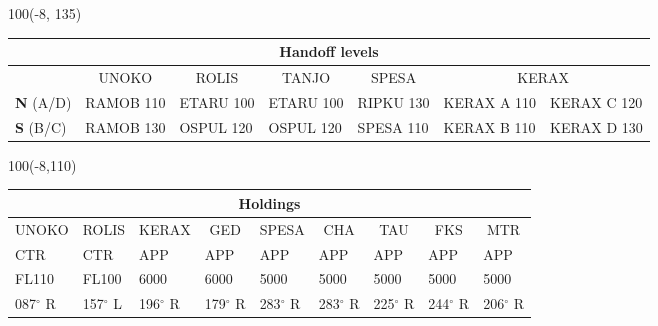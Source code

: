 \documentclass[10pt,landscape,a4paper]{article}
\begin{document}
\begin{textblock}{100}(-8, 135)
  \begin{table}[]
    \begin{tabular}{|l|l|l|l||l|l|l|}
      \multicolumn{7}{c}{\textbf{Handoff levels}}                                                                                                                                      \\ \hline
                       & \multicolumn{1}{c|}{UNOKO} & \multicolumn{1}{c|}{ROLIS} & \multicolumn{1}{c||}{TANJO} & \multicolumn{1}{c|}{SPESA} & \multicolumn{2}{c|}{KERAX}               \\ \hline
      \textbf{N} (A/D) & RAMOB 110                  & ETARU 100                  & ETARU 100                   & RIPKU 130                  & KERAX A 110                & KERAX C 120 \\
      \textbf{S} (B/C) & RAMOB 130                  & OSPUL 120                  & OSPUL 120                   & SPESA 110                  & KERAX B 110                & KERAX D 130 \\ \hline
    \end{tabular}
  \end{table}
\end{textblock}

\begin{textblock}{100}(-8,110)
  \begin{table}[]
    \begin{tabular}{|l|l|l|l|l|l|l|l|l|}

      \multicolumn{9}{c}{\textbf{Holdings}}                                                                                                                                                                                                                     \\ \hline
      \multicolumn{1}{|c|}{UNOKO} & \multicolumn{1}{c|}{ROLIS} & \multicolumn{1}{c|}{KERAX} & \multicolumn{1}{c|}{GED} & \multicolumn{1}{c|}{SPESA} & \multicolumn{1}{c|}{CHA} & \multicolumn{1}{c|}{TAU} & \multicolumn{1}{c|}{FKS} & \multicolumn{1}{c|}{MTR} \\ \hline
      CTR                         & CTR                        & APP                        & APP                      & APP                        & APP                      & APP                      & APP                      & APP                      \\
      FL110                       & FL100                      & 6000                       & 6000                     & 5000                       & 5000                     & 5000                     & 5000                     & 5000                     \\
      087$^\circ$ R               & 157$^\circ$ L              & 196$^\circ$ R              & 179$^\circ$ R            & 283$^\circ$ R              & 283$^\circ$ R            & 225$^\circ$ R            & 244$^\circ$ R            & 206$^\circ$ R            \\ \hline
    \end{tabular}
  \end{table}
\end{textblock}
\end{document}
